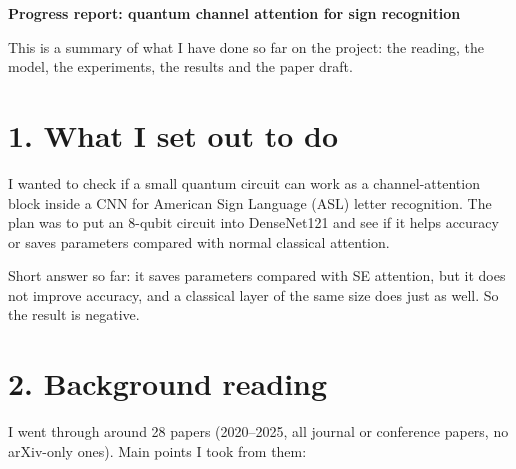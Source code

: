 \documentclass[11pt,a4paper]{article}
\begin{document}
{\Large\textbf{Progress report: quantum channel attention for sign recognition}}\par\medskip

This is a summary of what I have done so far on the project: the reading,
the model, the experiments, the results and the paper draft.

\section*{1. What I set out to do}

I wanted to check if a small quantum circuit can work as a channel-attention
block inside a CNN for American Sign Language (ASL) letter recognition. The
plan was to put an 8-qubit circuit into DenseNet121 and see if it helps
accuracy or saves parameters compared with normal classical attention.

Short answer so far: it saves parameters compared with SE attention, but it
does not improve accuracy, and a classical layer of the same size does just as
well. So the result is negative.

\section*{2. Background reading}

I went through around 28 papers (2020--2025, all journal or conference
papers, no arXiv-only ones). Main points I took from them:
\end{document}
